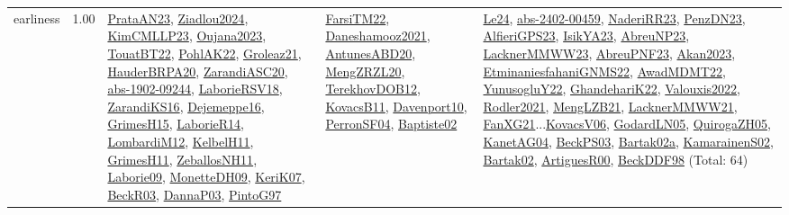 {\begin{longtable}{p{3cm}r>{\raggedright\arraybackslash}p{6cm}>{\raggedright\arraybackslash}p{6cm}>{\raggedright\arraybackslash}p{8cm}}
\index{earliness}\index{Concepts!earliness}earliness &  1.00 & \hyperref[detail:PrataAN23]{PrataAN23}, \hyperref[detail:Ziadlou2024]{Ziadlou2024}, \hyperref[detail:KimCMLLP23]{KimCMLLP23}, \hyperref[detail:Oujana2023]{Oujana2023}, \hyperref[detail:TouatBT22]{TouatBT22}, \hyperref[detail:PohlAK22]{PohlAK22}, \hyperref[detail:Groleaz21]{Groleaz21}, \hyperref[detail:HauderBRPA20]{HauderBRPA20}, \hyperref[detail:ZarandiASC20]{ZarandiASC20}, \hyperref[detail:abs-1902-09244]{abs-1902-09244}, \hyperref[detail:LaborieRSV18]{LaborieRSV18}, \hyperref[detail:ZarandiKS16]{ZarandiKS16}, \hyperref[detail:Dejemeppe16]{Dejemeppe16}, \hyperref[detail:GrimesH15]{GrimesH15}, \hyperref[detail:LaborieR14]{LaborieR14}, \hyperref[detail:LombardiM12]{LombardiM12}, \hyperref[detail:KelbelH11]{KelbelH11}, \hyperref[detail:GrimesH11]{GrimesH11}, \hyperref[detail:ZeballosNH11]{ZeballosNH11}, \hyperref[detail:Laborie09]{Laborie09}, \hyperref[detail:MonetteDH09]{MonetteDH09}, \hyperref[detail:KeriK07]{KeriK07}, \hyperref[detail:BeckR03]{BeckR03}, \hyperref[detail:DannaP03]{DannaP03}, \hyperref[detail:PintoG97]{PintoG97} & \hyperref[detail:FarsiTM22]{FarsiTM22}, \hyperref[detail:Daneshamooz2021]{Daneshamooz2021}, \hyperref[detail:AntunesABD20]{AntunesABD20}, \hyperref[detail:MengZRZL20]{MengZRZL20}, \hyperref[detail:TerekhovDOB12]{TerekhovDOB12}, \hyperref[detail:KovacsB11]{KovacsB11}, \hyperref[detail:Davenport10]{Davenport10}, \hyperref[detail:PerronSF04]{PerronSF04}, \hyperref[detail:Baptiste02]{Baptiste02} & \hyperref[detail:Le24]{Le24}, \hyperref[detail:abs-2402-00459]{abs-2402-00459}, \hyperref[detail:NaderiRR23]{NaderiRR23}, \hyperref[detail:PenzDN23]{PenzDN23}, \hyperref[detail:AlfieriGPS23]{AlfieriGPS23}, \hyperref[detail:IsikYA23]{IsikYA23}, \hyperref[detail:AbreuNP23]{AbreuNP23}, \hyperref[detail:LacknerMMWW23]{LacknerMMWW23}, \hyperref[detail:AbreuPNF23]{AbreuPNF23}, \hyperref[detail:Akan2023]{Akan2023}, \hyperref[detail:EtminaniesfahaniGNMS22]{EtminaniesfahaniGNMS22}, \hyperref[detail:AwadMDMT22]{AwadMDMT22}, \hyperref[detail:YunusogluY22]{YunusogluY22}, \hyperref[detail:GhandehariK22]{GhandehariK22}, \hyperref[detail:Valouxis2022]{Valouxis2022}, \hyperref[detail:Rodler2021]{Rodler2021}, \hyperref[detail:MengLZB21]{MengLZB21}, \hyperref[detail:LacknerMMWW21]{LacknerMMWW21}, \hyperref[detail:FanXG21]{FanXG21}...\hyperref[detail:KovacsV06]{KovacsV06}, \hyperref[detail:GodardLN05]{GodardLN05}, \hyperref[detail:QuirogaZH05]{QuirogaZH05}, \hyperref[detail:KanetAG04]{KanetAG04}, \hyperref[detail:BeckPS03]{BeckPS03}, \hyperref[detail:Bartak02a]{Bartak02a}, \hyperref[detail:KamarainenS02]{KamarainenS02}, \hyperref[detail:Bartak02]{Bartak02}, \hyperref[detail:ArtiguesR00]{ArtiguesR00}, \hyperref[detail:BeckDDF98]{BeckDDF98} (Total: 64)\\

\end{longtable}}
